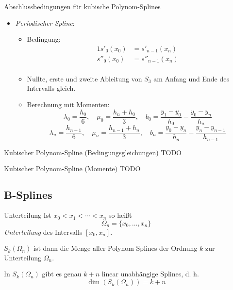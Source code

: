 \begin{defi}{Abschlussbedingungen für kubische Polynom-Splines}
\begin{itemize}
\begin{itemize}
              \end{itemize}
        \item \emph{Periodischer Spline}:
              \begin{itemize}
                  \item Bedingung:
                        \begin{alignat*}{1}
                            s'_0(x_0)  & = s'_{n-1}(x_n)  \\
                            s''_0(x_0) & = s''_{n-1}(x_n) \\
                        \end{alignat*}
                  \item Nullte, erste und zweite Ableitung von $S_3$ am Anfang und Ende des Intervalls gleich.
                  \item Berechnung mit Momenten:
                        \[
                            \lambda_0 = \frac{h_0}{6}, \quad \mu_0 = \frac{h_n + h_0}{3}, \quad b_0 = \frac{y_1 - y_0}{h_0} - \frac{y_0 - y_n}{h_n}
                        \]
                        \[
                            \lambda_n = \frac{h_{n-1}}{6}, \quad \mu_n = \frac{h_{n-1} + h_n}{3}, \quad b_n = \frac{y_0 - y_n}{h_n} - \frac{y_n - y_{n-1}}{h_{n-1}}
                        \]
              \end{itemize}
    \end{itemize}
\end{defi}

\begin{example}{Kubischer Polynom-Spline (Bedingungsgleichungen)}
    TODO
\end{example}

\begin{example}{Kubischer Polynom-Spline (Momente)}
    TODO
\end{example}

\subsection{B-Splines}

\begin{defi}{Unterteilung}
    Ist $x_0 < x_1 < \cdots < x_n$ so heißt  
    \[ 
        \Omega_n = \{ x_0, \ldots, x_n \}
    \]
    \emph{Unterteilung} des Intervalls $[x_0, x_n]$. 
    
    $S_k(\Omega_n)$ ist dann die Menge aller Polynom-Splines der Ordnung $k$ zur Unterteilung $\Omega_n$.
    
    In $S_k(\Omega_n)$ gibt es genau $k+n$ linear unabhängige Splines, d. h. 
    \[ 
        \dim(S_k(\Omega_n)) = k + n
    \]
\end{defi}

